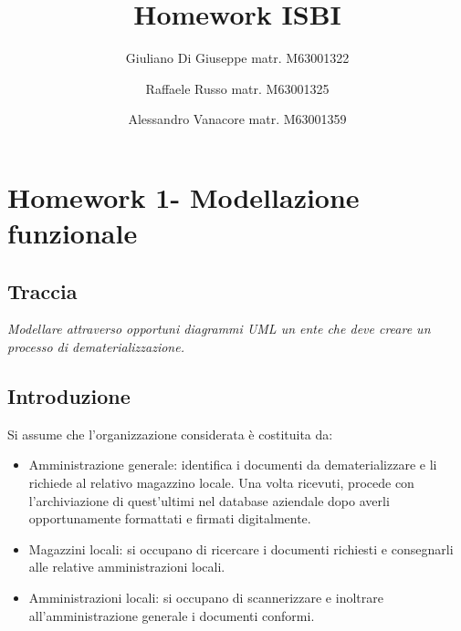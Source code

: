 \documentclass{article}
\title{Homework ISBI}
\author{Giuliano Di Giuseppe matr. M63001322
    \and Raffaele Russo matr. M63001325 
    \and Alessandro Vanacore matr. M63001359}
\date{}
\begin{document}
\maketitle
\tableofcontents
\newpage

\section{Homework 1- Modellazione funzionale}
\subsection{Traccia}
\textit{
Modellare attraverso opportuni diagrammi UML un ente che deve creare un processo di dematerializzazione.}
\subsection{Introduzione}
Si assume che l'organizzazione considerata è costituita da:
\begin{itemize}
    \item Amministrazione generale: identifica i documenti da dematerializzare e li richiede al relativo magazzino locale. Una volta ricevuti, procede con l'archiviazione di quest'ultimi nel database aziendale dopo averli opportunamente formattati e firmati digitalmente.
     \item Magazzini locali: si occupano di ricercare i documenti richiesti e consegnarli alle relative amministrazioni locali.
    \item Amministrazioni locali: si occupano di scannerizzare e inoltrare all'amministrazione generale i documenti conformi.
   
    
\end{itemize}
\end{document}
